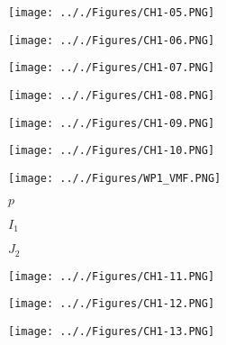 \documentclass[onecolumn,11pt]{report}
\def\lthtmlcheckvsize{\ifdim\ht\sizebox<\vsize 
  \ifdim\wd\sizebox<\hsize\expandafter\hfill\fi \expandafter\vfill
  \else\expandafter\vss\fi}%
\begin{document}
{\newpage\clearpage
{}%
\texttt{[image: .././Figures/CH1-05.PNG]}%
\lthtmlpictureZ
\lthtmlcheckvsize\clearpage}

{\newpage\clearpage
{}%
\texttt{[image: .././Figures/CH1-06.PNG]}%
\lthtmlpictureZ
\lthtmlcheckvsize\clearpage}

{\newpage\clearpage
{}%
\texttt{[image: .././Figures/CH1-07.PNG]}%
\lthtmlpictureZ
\lthtmlcheckvsize\clearpage}

{\newpage\clearpage
{}%
\texttt{[image: .././Figures/CH1-08.PNG]}%
\lthtmlpictureZ
\lthtmlcheckvsize\clearpage}

{\newpage\clearpage
{}%
\texttt{[image: .././Figures/CH1-09.PNG]}%
\lthtmlpictureZ
\lthtmlcheckvsize\clearpage}

{\newpage\clearpage
{}%
\texttt{[image: .././Figures/CH1-10.PNG]}%
\lthtmlpictureZ
\lthtmlcheckvsize\clearpage}

{\newpage\clearpage
{}%
\texttt{[image: .././Figures/WP1\_VMF.PNG]}%
\lthtmlpictureZ
\lthtmlcheckvsize\clearpage}

{\newpage\clearpage
{}%
$ p$%
\lthtmlindisplaymathZ
\lthtmlcheckvsize\clearpage}

{\newpage\clearpage
{}%
$ I_1$%
\lthtmlindisplaymathZ
\lthtmlcheckvsize\clearpage}

{\newpage\clearpage
{}%
$ J_2$%
\lthtmlindisplaymathZ
\lthtmlcheckvsize\clearpage}

{\newpage\clearpage
{}%
\texttt{[image: .././Figures/CH1-11.PNG]}%
\lthtmlpictureZ
\lthtmlcheckvsize\clearpage}

{\newpage\clearpage
{}%
\texttt{[image: .././Figures/CH1-12.PNG]}%
\lthtmlpictureZ
\lthtmlcheckvsize\clearpage}

{\newpage\clearpage
{}%
\texttt{[image: .././Figures/CH1-13.PNG]}%
\lthtmlpictureZ
\lthtmlcheckvsize\clearpage}
\end{document}
